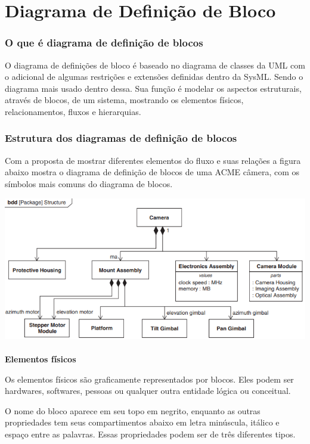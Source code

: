 \section{Diagrama de Definição de Bloco}

\subsubsection{O que é diagrama de definição de blocos}

O diagrama de definições de bloco é baseado no diagrama de classes da UML com o adicional de algumas restrições e extensões definidas dentro da SysML. Sendo o diagrama mais usado dentro dessa. Sua função é modelar os aspectos estruturais, através de blocos, de um sistema, mostrando os elementos físicos, relacionamentos, fluxos e hierarquias.

\subsubsection{Estrutura dos diagramas de definição de blocos}

Com a proposta de mostrar diferentes elementos do fluxo e suas relações a figura abaixo mostra o diagrama de definição de blocos de uma ACME câmera, com os símbolos mais comuns do diagrama de blocos.

\includegraphics[width=\textwidth,height=\textheight,keepaspectratio]{figures/diagrama de blocos.PNG}

\paragraph{}
 \textbf{Elementos físicos} 
 
 
Os elementos físicos são graficamente representados por blocos. Eles podem ser hardwares, softwares, pessoas ou qualquer outra entidade lógica ou conceitual. 

O nome do bloco aparece em seu topo em negrito, enquanto as outras propriedades tem seus compartimentos abaixo em letra minúscula, itálico e espaço entre as palavras. Essas propriedades podem ser de três diferentes tipos. 

